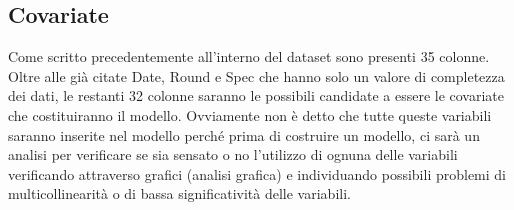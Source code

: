 \subsection{Covariate}

Come scritto precedentemente all'interno del dataset sono presenti 35 colonne. Oltre alle già citate \textsf{Date}, \textsf{Round} e \textsf{Spec} che hanno solo un valore di completezza dei dati, le restanti 32 colonne saranno le possibili candidate a essere le covariate che costituiranno il modello. Ovviamente non è detto che tutte queste variabili saranno inserite nel modello perché prima di costruire un modello, ci sarà un analisi per verificare se sia sensato o no l'utilizzo di ognuna delle variabili verificando attraverso grafici (analisi grafica) e individuando possibili problemi di multicollinearità o di bassa significatività delle variabili.\\

